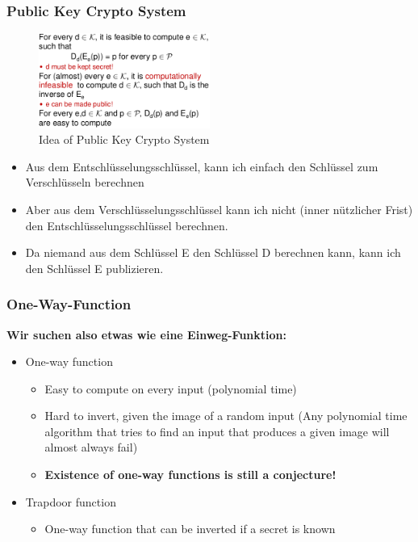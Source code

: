 \hypertarget{idea}{%
\subsubsection{Public Key Crypto System}\label{idea}}

\begin{figure}[H]
\centering
\includegraphics[width=0.5\textwidth]{figures/publicKeyIdea.png}
\caption{Idea of Public Key Crypto System}
\end{figure}

\begin{itemize}
\tightlist
\item
  Aus dem Entschlüsselungsschlüssel, kann ich einfach den Schlüssel zum
  Verschlüsseln berechnen
\item
  Aber aus dem Verschlüsselungsschlüssel kann ich nicht (inner
  nützlicher Frist) den Entschlüsselungsschlüssel berechnen.
\item
  Da niemand aus dem Schlüssel E den Schlüssel D berechnen kann, kann
  ich den Schlüssel E publizieren.
\end{itemize}

\subsubsection{One-Way-Function}
\textbf{Wir suchen also etwas wie eine Einweg-Funktion:} 
\begin{itemize}
    \item One-way function
    \begin{itemize}
        \item Easy to compute on every input (polynomial time)
        \item Hard to invert, given the image of a random input (Any polynomial time algorithm that tries to find an input that produces a given image will almost always fail)
        \item \textbf{Existence of one-way functions is still a conjecture!}
    \end{itemize}
    \item Trapdoor function
    \begin{itemize}
        \item One-way function that can be inverted if a secret is known
    \end{itemize}
\end{itemize}

